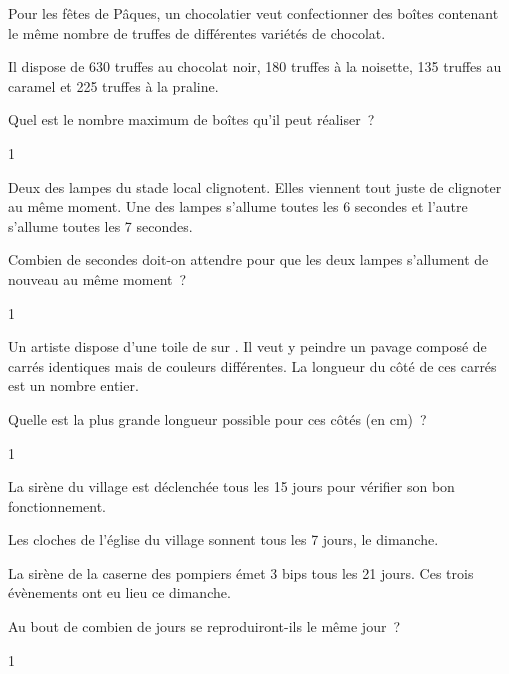 \documentclass[a4paper,11pt]{report}
\begin{document}
\begin{exo}{  %
    Pour les fêtes de Pâques, un chocolatier veut confectionner des boîtes contenant le même nombre de truffes   de différentes variétés de chocolat. 

    Il dispose de 630 truffes au chocolat noir, 180 truffes à la noisette, 135 truffes au caramel et 225 truffes à la praline. 

    Quel est le nombre maximum de boîtes qu'il peut réaliser~?
}{1}\end{exo}




\begin{exo}{ %
    Deux des lampes du stade local clignotent. Elles viennent tout juste de clignoter au même moment. Une des lampes s'allume toutes les  6 secondes et l'autre s'allume toutes les 7 secondes.

    Combien de secondes doit-on attendre pour que les deux lampes s'allument de nouveau au même moment~? 
}{1}\end{exo}



\begin{exo}{ %
		Un artiste dispose d'une toile de  sur . Il veut y peindre un pavage composé de carrés identiques mais de couleurs différentes. La longueur du côté de ces carrés est un nombre entier. 

    Quelle est la plus grande longueur possible pour ces côtés (en cm)~?
}{1}\end{exo}


\begin{exo}{ %
    La sirène du village est déclenchée tous les 15 jours pour vérifier son bon fonctionnement. 

    Les cloches de l'église du village sonnent tous les 7 jours, le dimanche. 

    La sirène de la caserne des pompiers émet 3 bips tous les 21 jours. Ces trois évènements ont eu lieu ce dimanche. 

    Au bout de combien de jours se reproduiront-ils le même jour~?
}{1}\end{exo}
\end{document}
